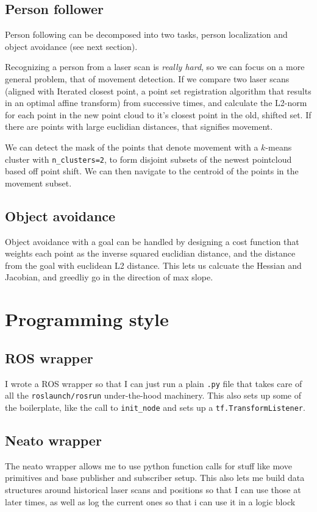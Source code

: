 \documentclass[]{article}
\begin{document}
\subsection{Person follower}
Person following can be decomposed into two tasks, person localization and object avoidance (see next section).

Recognizing a person from a laser scan is \textit{really hard}, so we can focus on a more general problem, that of movement detection. If we compare two laser scans (aligned with Iterated closest point, a point set registration algorithm that results in an optimal affine transform) from successive times, and calculate the L2-norm for each point in the new point cloud to it's closest point in the old, shifted set. If there are points with large euclidian distances, that signifies movement.


We can detect the mask of the points that denote movement with a $k$-means cluster with \verb|n_clusters=2|, to form disjoint subsets of the newest pointcloud based off point shift. We can then navigate to the centroid of the points in the movement subset.

\subsection{Object avoidance}
Object avoidance with a goal can be handled by designing a cost function that weights each point as the inverse squared euclidian distance, and the distance from the goal with euclidean L2 distance. This lets us calcuate the Hessian and Jacobian, and greedliy go in the direction of max slope.
\section{Programming style}
\subsection{ROS wrapper}
I wrote a ROS wrapper so that I can just run a plain \verb|.py| file that takes care of all the \verb|roslaunch/rosrun| under-the-hood machinery. This also sets up some of the boilerplate, like the call to \verb|init_node| and sets up a \verb|tf.TransformListener|.
\subsection{Neato wrapper}
The neato wrapper allows me to use python function calls for stuff like move primitives and base publisher and subscriber setup. This also lets me build data structures around historical laser scans and positions so that I can use those at later times, as well as log the current ones so that i can use it in a logic block
\end{document}
